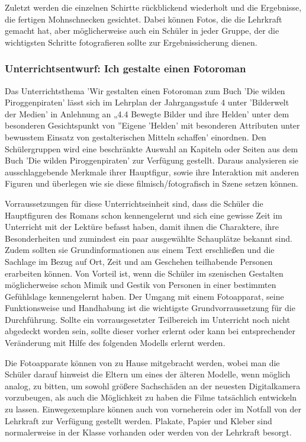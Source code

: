 {Zuletzt werden die einzelnen Schirtte rückblickend wiederholt und die Ergebnisse, die fertigen Mohnschnecken gesichtet. Dabei können Fotos, die die Lehrkraft gemacht hat, aber möglicherweise auch ein Schüler in jeder Gruppe, der die wichtigsten Schritte fotografieren sollte zur Ergebnissicherung dienen.

\subsubsection{Unterrichtsentwurf: Ich gestalte einen Fotoroman}

Das Unterrichtsthema 'Wir gestalten einen Fotoroman zum Buch 'Die wilden Piroggenpiraten' lässt sich im Lehrplan der Jahrgangsstufe 4 unter 'Bilderwelt der Medien' in Anlehnung an „4.4 Bewegte Bilder und ihre Helden' unter dem besonderen Gesichtspunkt von ''Eigene 'Helden' mit besonderen Attributen unter bewusstem Einsatz von gestalterischen Mitteln schaffen' einordnen. Den Schülergruppen wird eine beschränkte Auswahl an Kapiteln oder Seiten aus dem Buch 'Die wilden Piroggenpiraten' zur Verfügung gestellt. Daraus analysieren sie ausschlaggebende Merkmale ihrer Hauptfigur, sowie ihre Interaktion mit anderen Figuren und überlegen wie sie diese filmisch/fotografisch in Szene setzen können. 

Vorraussetzungen für diese Unterrichtseinheit sind, dass die Schüler die Hauptfiguren des Romans schon kennengelernt und sich eine gewisse Zeit im Unterricht mit der Lektüre befasst haben, damit ihnen die Charaktere, ihre Besonderheiten und zumindest ein paar ausgewählte Schauplätze bekannt sind. Zudem sollten sie  Grundinformationen aus einem Text erschließen und die Sachlage im Bezug auf Ort, Zeit und am Geschehen teilhabende Personen erarbeiten können. Von Vorteil ist, wenn die Schüler im szenischen Gestalten möglicherweise schon Mimik und Gestik von Personen in einer bestimmten Gefühlslage kennengelernt haben. Der Umgang mit einem Fotoapparat, seine Funktionsweise und Handhabung ist die wichtigste Grundvorraussetzung für die Durchführung. Sollte ein vorrausgesetzter Teilbereich im Unterricht noch nicht abgedeckt worden sein, sollte dieser vorher erlernt oder kann bei entsprechender Veränderung mit Hilfe des folgenden Modells erlernt werden.

Die Fotoapparate können von zu Hause mitgebracht werden, wobei man die Schüler darauf hinweist die Eltern um eines der älteren Modelle, wenn möglich analog, zu bitten, um sowohl größere Sachschäden an der neuesten Digitalkamera vorzubeugen, als auch die Möglichkeit zu haben die Filme tatsächlich entwickeln zu lassen. Einwegexemplare können auch von vorneherein oder im Notfall von der Lehrkraft zur Verfügung gestellt werden. 
Plakate, Papier und Kleber sind normalerweise in der Klasse vorhanden oder werden von der Lehrkraft besorgt.

}
